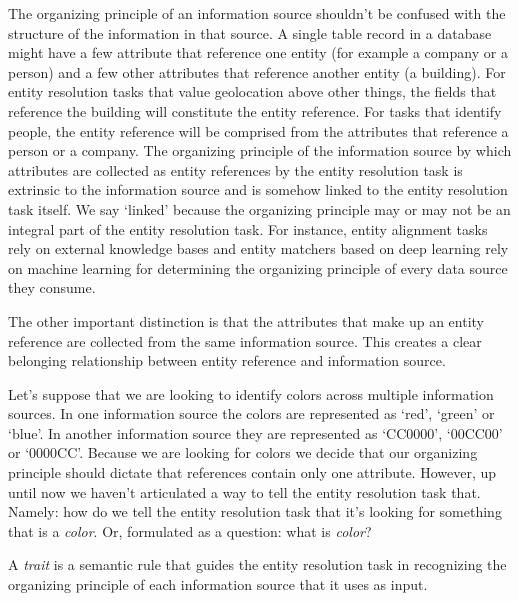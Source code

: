 \documentclass[11pt]{article}
\begin{document}
    The organizing principle of an information source shouldn't be confused with
    the structure of the information in that source.
    A single table record in a database might have a few attribute that
    reference one entity (for example a company or a person) and a few other
    attributes that reference another entity (a building).
    For entity resolution tasks that value geolocation above other things, the 
    fields that reference the building will constitute the entity reference.
    For tasks that identify people, the entity reference will be comprised from
    the attributes that reference a person or a company.
    The organizing principle of the information source by which attributes are
    collected as entity references by the entity resolution task is extrinsic to
    the information source and is somehow linked to the entity resolution task
    itself.
    We say `linked' because the organizing principle may or may not be an
    integral part of the entity resolution task.
    For instance, entity alignment tasks rely on external knowledge bases and
    entity matchers based on deep learning rely on machine learning for
    determining the organizing principle of every data source they consume.

    The other important distinction is that the attributes that make up an
    entity reference are collected from the same information source.
    This creates a clear belonging relationship between entity reference and
    information source.
    
    Let's suppose that we are looking to identify colors across multiple
    information sources.
    In one information source the colors are represented as `red', `green' or 
    `blue'.
    In another information source they are represented as `CC0000', `00CC00' or
    `0000CC'.
    Because we are looking for colors we decide that our organizing principle
    should dictate that references contain only one attribute.
    However, up until now we haven't articulated a way to tell the entity
    resolution task that.
    Namely: how do we tell the entity resolution task that it's looking for
    something that is a \textit{color}.
    Or, formulated as a question: what is \textit{color}?

    \begin{defn}
        A \textit{trait} is a semantic rule that guides the entity resolution
        task in recognizing the organizing principle of each information source
        that it uses as input.
    \end{defn}
\end{document}
